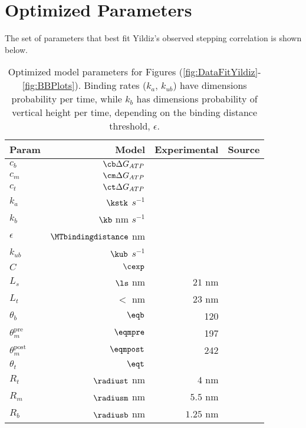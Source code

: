\section{Optimized Parameters}\label{sec:Params}
The set of parameters that best fit Yildiz's observed stepping correlation is shown below.

\begin{table}[H]
  \centering
  \begin{tabular}{|l | r | r | r|}
  	\hline
    Param & Model & Experimental & Source \\
    \hline
    $c_b$ & $\cb \Delta G_{ATP}$ &  & \\
    $c_m$ & $\cm \Delta G_{ATP}$ &  & \\
    $c_t$ & $\ct \Delta G_{ATP}$ &  & \\
    $k_a$ & $\kstk$  $s^{-1}$ &  & \\
    $k_b$ & $\kb$  nm $s^{-1}$ &  & \\
    $\epsilon$ &  $\MTbindingdistance$ nm & & \\
    $k_{ub}$ & $\kub$ $s^{-1}$ & & \\
    $C$ & $\cexp$ & & \\
    $L_s$ & $\ls$ nm & $21$ nm & \cite{Burgess2003, 3vkh-cite, carter-paper}\\
    $L_t$ & $\lt$ nm & $23$ nm & \cite{Burgess2003, 3vkh-cite, carter-paper}\\
    $\theta_b$ & $\eqb$ &  120 & \cite{leschziner} \\
    $\theta_m^{\mbox{pre}}$ & $\eqmpre$ &  197 & \cite{Burgess2003}\\
    $\theta_m^{\mbox{post}}$ & $\eqmpost$ & 242 & \cite{Burgess2003}\\
    $\theta_t$ & $\eqt$ &  & \\
    $R_t$ & $\radiust$ nm & $4$ nm & \cite{Burgess2003}\\
    $R_m$ & $\radiusm$ nm & $5.5$ nm & \cite{Burgess2003}\\
    $R_b$ & $\radiusb$ nm & $1.25$ nm & \cite{Burgess2003}\\
    \hline
  \end{tabular}
  \caption{Optimized model parameters for Figures (\ref{fig:DataFitYildiz}-\ref{fig:BBPlots}). Binding rates ($k_a$, $k_{ub}$) have dimensions probability per time, while $k_b$ has dimensions probability of vertical height per time, depending on the binding distance threshold, $\epsilon$.}
  \label{tab:params}
\end{table}

